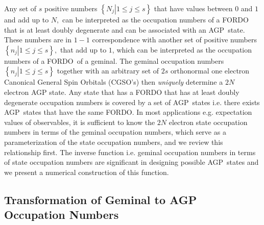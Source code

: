 \documentclass[aps,preprint]{revtex4}%
\begin{document}
Any set of $s$ positive numbers $\left\{  \left.  N_{j}\right\vert 1\leq j\leq
s\right\}  $ that have values between $0$ and $1$ and add up to $N,$ can be
interpreted as the occupation numbers of a FORDO that is at least doubly
degenerate and can be associated with an AGP\ state. These numbers are in
$1-1$ correspondence with another set of positive numbers $\left\{  \left.
n_{j}\right\vert 1\leq j\leq s\right\}  ,$ that add up to $1$, which can be
interpreted as the occupation numbers of a FORDO\ of a geminal. The geminal
occupation numbers $\left\{  \left.  n_{j}\right\vert 1\leq j\leq s\right\}  $
together with an arbitrary set of $2s$ orthonormal one electron Canonical
General Spin Orbitals (CGSO's) then \emph{uniquely }determine a $2N$ electron
AGP state. Any state that has a FORDO that has at least doubly degenerate
occupation numbers is covered by a set of AGP\ states i.e. there exists
AGP\ states that have the same FORDO. In most applications e.g. expectation
values of observables, it is sufficient to know the $2N$ electron state
occupation numbers in terms of the geminal occupation numbers, which serve as
a parameterization of the state occupation numbers, and we review this
relationship first. The inverse function i.e. geminal occupation numbers in
terms of state occupation numbers are significant in designing possible
AGP\ states and we present a numerical construction of this function.

\subsection{Transformation of Geminal to AGP Occupation Numbers}
\end{document}
